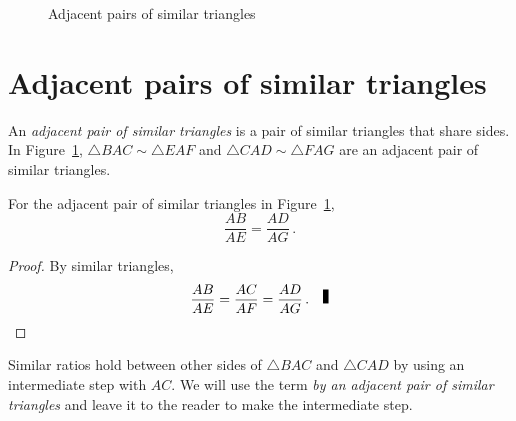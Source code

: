 \begin{figure}[b]
\begin{center}
\end{center}
\caption{Adjacent pairs of similar triangles}\label{f.adjacent}
\end{figure}


\section{Adjacent pairs of similar triangles}

\begin{definition}
An \emph{adjacent pair of similar triangles} is a pair of similar triangles that share sides. In Figure~\ref{f.adjacent}, $\triangle BAC\sim \triangle EAF$ and $\triangle CAD\sim \triangle FAG$ are an adjacent pair of similar triangles.
\end{definition}
\begin{theorem}
For the adjacent pair of similar triangles in Figure~\ref{f.adjacent},
\[
\frac{AB}{AE}=\frac{AD}{AG}\,.
\]
\end{theorem}
\begin{proof} By similar triangles,
\[
\frac{AB}{AE}=\frac{AC}{AF}=\frac{AD}{AG}\,.\fqed
\]%
\end{proof}
Similar ratios hold between other sides of $\triangle BAC$ and $\triangle CAD$ by using an intermediate step with $AC$. We will use the term \emph{by an adjacent pair of similar triangles} and leave it to the reader to make the intermediate step.

